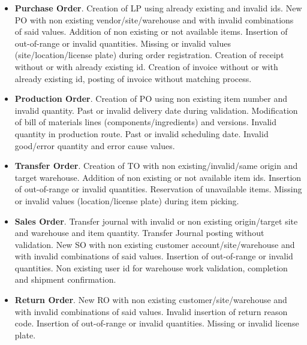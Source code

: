 \begin{itemize}
    \item \textbf{Purchase Order}. Creation of LP using already existing and invalid ids. New PO with non existing vendor/site/warehouse and with invalid combinations of said values. Addition of non existing or not available items. Insertion of out-of-range or invalid quantities. Missing or invalid values (site/location/license plate) during order registration. Creation of receipt without or with already existing id. Creation of invoice without or with already existing id, posting of invoice without matching process. 
    \item \textbf{Production Order}. Creation of PO using non existing item number and invalid quantity. Past or invalid delivery date during validation. Modification of bill of materials lines (components/ingredients) and versions. Invalid quantity in production route. Past or invalid scheduling date. Invalid good/error quantity and error cause values.
    \item \textbf{Transfer Order}. Creation of TO with non existing/invalid/same origin and target warehouse. Addition of non existing or not available item ids. Insertion of out-of-range or invalid quantities. Reservation of unavailable items. Missing or invalid values (location/license plate) during item picking.
    \item \textbf{Sales Order}. Transfer journal with invalid or non existing origin/target site and warehouse and item quantity. Transfer Journal posting without validation. New SO with non existing customer account/site/warehouse and with invalid combinations of said values. Insertion of out-of-range or invalid quantities. Non existing user id for warehouse work validation, completion and shipment confirmation.
    \item \textbf{Return Order}. New RO with non existing customer/site/warehouse and with invalid combinations of said values. Invalid insertion of return reason code. Insertion of out-of-range or invalid quantities. Missing or invalid license plate.
\end{itemize}

